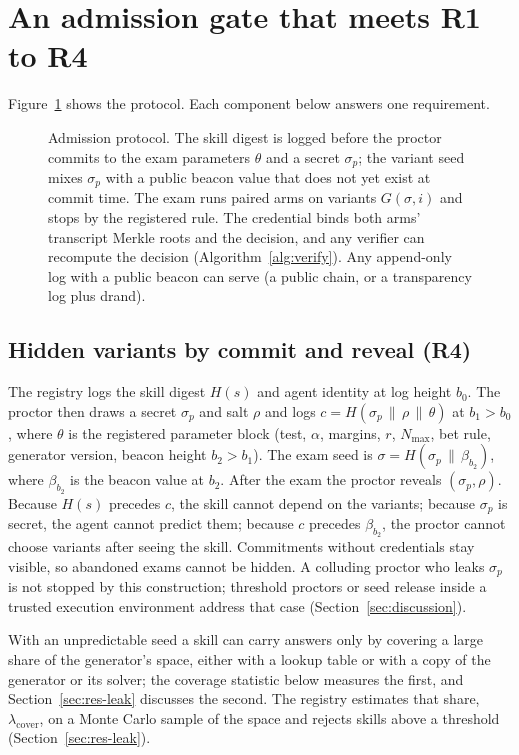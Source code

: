 \section{An admission gate that meets R1 to R4}
\label{sec:gate}

Figure~\ref{fig:protocol} shows the protocol. Each component below answers one requirement.

\begin{figure}[t]
\centering

\caption{Admission protocol. The skill digest is logged before the proctor commits to the exam parameters $\theta$ and a secret $\sigma_p$; the variant seed mixes $\sigma_p$ with a public beacon value that does not yet exist at commit time. The exam runs paired arms on variants $G(\sigma,i)$ and stops by the registered rule. The credential binds both arms' transcript Merkle roots and the decision, and any verifier can recompute the decision (Algorithm~\ref{alg:verify}). Any append-only log with a public beacon can serve (a public chain, or a transparency log plus drand).}
\label{fig:protocol}
\end{figure}

\subsection{Hidden variants by commit and reveal (R4)}
The registry logs the skill digest $H(s)$ and agent identity at log height $b_0$. The proctor then draws a secret $\sigma_p$ and salt $\rho$ and logs $c=H(\sigma_p\,\|\,\rho\,\|\,\theta)$ at $b_1>b_0$, where $\theta$ is the registered parameter block (test, $\alpha$, margins, $r$, $N_{\max}$, bet rule, generator version, beacon height $b_2>b_1$). The exam seed is $\sigma=H(\sigma_p\,\|\,\beta_{b_2})$, where $\beta_{b_2}$ is the beacon value at $b_2$. After the exam the proctor reveals $(\sigma_p,\rho)$. Because $H(s)$ precedes $c$, the skill cannot depend on the variants; because $\sigma_p$ is secret, the agent cannot predict them; because $c$ precedes $\beta_{b_2}$, the proctor cannot choose variants after seeing the skill. Commitments without credentials stay visible, so abandoned exams cannot be hidden. A colluding proctor who leaks $\sigma_p$ is not stopped by this construction; threshold proctors or seed release inside a trusted execution environment address that case (Section~\ref{sec:discussion}).

With an unpredictable seed a skill can carry answers only by covering a large share of the generator's space, either with a lookup table or with a copy of the generator or its solver; the coverage statistic below measures the first, and Section~\ref{sec:res-leak} discusses the second. The registry estimates that share, $\lambda_{\text{cover}}$, on a Monte Carlo sample of the space and rejects skills above a threshold (Section~\ref{sec:res-leak}).

